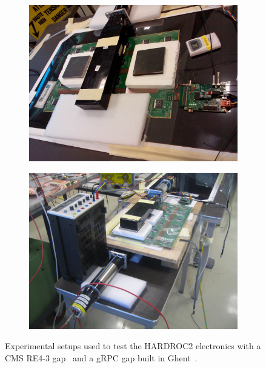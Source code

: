 	\begin{figure}[H]
		\begin{subfigure}{.5\linewidth}
		    \centering
			\includegraphics[width = \linewidth]{fig/chapt6/Setup_HARDROC_PAK.jpg}
			\caption{\label{fig:Setup-HARDROC2:A}}
		\end{subfigure}
		\begin{subfigure}{.5\linewidth}
		    \centering
			\includegraphics[width = \linewidth]{fig/chapt6/Setup_HARDROC_gRPC.JPG}
			\caption{\label{fig:Setup-HARDROC2:B}}
		\end{subfigure}
		\caption{\label{fig:Setup-HARDROC2} Experimental setups used to test the HARDROC2 electronics with a CMS RE4-3 gap~ and a gRPC gap built in Ghent~.}
    \end{figure}
	
